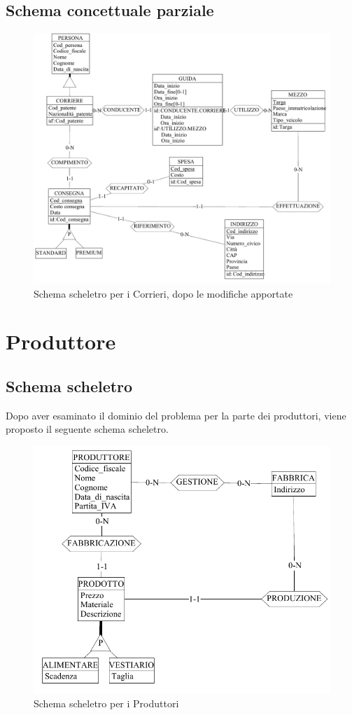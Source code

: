 \documentclass[a4paper,12pt]{report}
\begin{document}
\subsection{Schema concettuale parziale}
\begin{figure}[h]
	\centering{}
	\includegraphics[width=\textwidth]{img/SchemaConcettuale-Corrieri2.pdf}
	\caption{Schema scheletro per i Corrieri, dopo le modifiche apportate}
\end{figure}
\section{Produttore}
\subsection{Schema scheletro}
Dopo aver esaminato il dominio del problema per la parte dei produttori, viene proposto il seguente schema scheletro.
\begin{figure}[h]
	\centering{}
	\includegraphics[width=\textwidth]{img/SchemaConcettuale-Produttori1.pdf}
	\caption{Schema scheletro per i Produttori}
\end{figure}
\end{document}
